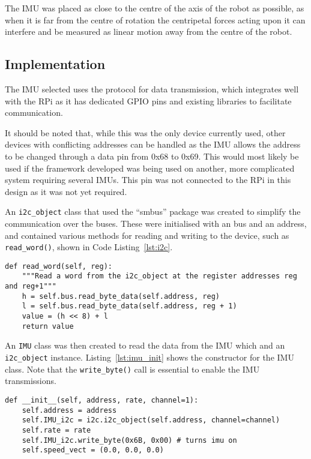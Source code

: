 The IMU was placed as close to the centre of the axis of the robot
as possible, as when it is far from the centre of rotation the centripetal
forces acting upon it can interfere and be measured as linear motion away
from the centre of the robot.

\subsection{Implementation}\label{elec/imu/impl}
The IMU selected uses the \isc{} protocol for data transmission, which
integrates well with the RPi as it has dedicated \isc{} GPIO pins and
existing libraries to facilitate communication.

It should be noted that, while this was the only \isc{} device currently
used, other devices with conflicting addresses can be handled as the IMU
allows the address to be changed through a data pin from 0x68 to 0x69.
This would most likely be used if the framework developed was being used
on another, more complicated system requiring several IMUs. This pin was
not connected to the RPi in this design as it was not yet required.

An \verb|i2c_object| class that used the ``smbus'' package was created to
simplify the communication over the \isc{} buses. These
were initialised with an \isc{} bus and an address, and
contained various methods for reading and writing to the \isc{} device,
such as \verb|read_word()|, shown in Code Listing~\ref{lst:i2c}.

\begin{lstlisting}[caption={I2C \texttt{read\_word()} function}, label={lst:i2c}]
def read_word(self, reg):
    """Read a word from the i2c_object at the register addresses reg and reg+1"""
    h = self.bus.read_byte_data(self.address, reg)
    l = self.bus.read_byte_data(self.address, reg + 1)
    value = (h << 8) + l
    return value
\end{lstlisting}

An \verb|IMU| class was then created to read the data from the IMU which
and an \verb|i2c_object| instance. Listing~\ref{lst:imu_init} shows
the constructor for the IMU class. Note that the \verb|write_byte()| call
is essential to enable the IMU transmissions.

\begin{lstlisting}[caption={IMU Initialisation Function}, label={lst:imu_init}]
def __init__(self, address, rate, channel=1):
    self.address = address
    self.IMU_i2c = i2c.i2c_object(self.address, channel=channel)
    self.rate = rate
    self.IMU_i2c.write_byte(0x6B, 0x00) # turns imu on
    self.speed_vect = (0.0, 0.0, 0.0)
\end{lstlisting}

